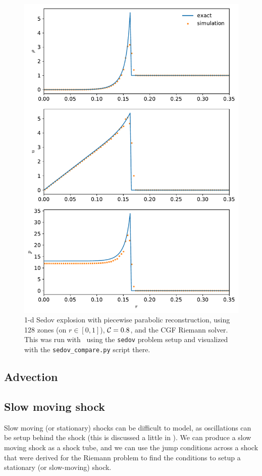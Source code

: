 \begin{figure}[t]
\centering
\includegraphics[width=0.7\linewidth]{hydro1d_sedov_1dsph}
\caption{\label{fig:Euler:doublerare:ppm} 1-d Sedov explosion with
  piecewise parabolic reconstruction, using 128 zones (on $r \in
  [0,1]$), ${\mathcal{C}} = 0.8$, and the CGF Riemann solver.  This was run
  with \hydrooned\ using the {\tt sedov} problem setup and visualized
  with the {\tt sedov\_compare.py} script there.}
\end{figure}


\subsection{Advection}

\subsection{Slow moving shock}

Slow moving (or stationary) shocks can be difficult to model, as
oscillations can be setup behind the shock (this is discussed a little
in \cite{colellawoodward:1984,leveque:2002}).  We can produce a slow
moving shock as a shock tube, and we can use the jump conditions 
across a shock that were derived for the Riemann problem to find the
conditions to setup a stationary (or slow-moving) shock.  

